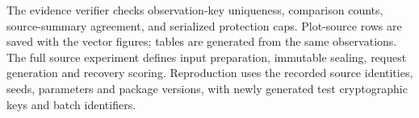 \documentclass[10pt,journal,onecolumn]{IEEEtran}
\begin{document}
The evidence verifier checks observation-key uniqueness, comparison counts,
source-summary agreement, and serialized protection caps. Plot-source rows are
saved with the vector figures; tables are generated from the same observations.
The full source experiment defines input preparation, immutable sealing,
request generation and recovery scoring. Reproduction uses the recorded source
identities, seeds, parameters and package versions, with newly generated test
cryptographic keys and batch identifiers.



\end{document}
